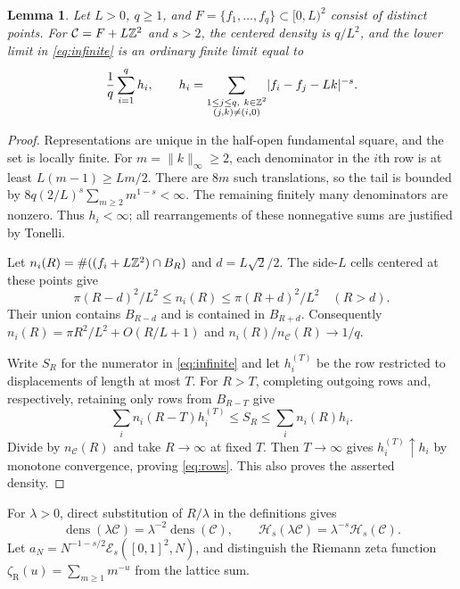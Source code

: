 \documentclass[11pt]{article}
\newtheorem{lemma}[theorem]{Lemma}
\newcommand{\Es}{\mathcal E_s}\newcommand{\Hs}{\mathcal H_s}
\newcommand{\abs}[1]{\lvert#1\rvert}\newcommand{\norm}[1]{\lVert#1\rVert}
\begin{document}
\begin{lemma}\label{lem:periodic}
Let $L>0$, $q\ge1$, and $F=\{f_1,\ldots,f_q\}\subset[0,L)^2$ consist of distinct
points. For $\mathcal C=F+L\mathbb Z^2$ and $s>2$, the centered density is $q/L^2$,
and the lower limit in \eqref{eq:infinite} is an ordinary finite limit equal to
\begin{equation}\label{eq:rows}
 \frac1q\sum_{i=1}^q h_i,\qquad
 h_i=\sum_{\substack{1\le j\le q,\ k\in\Z^2\\(j,k)\ne(i,0)}}
       \abs{f_i-f_j-Lk}^{-s}.
\end{equation}
\end{lemma}
\begin{proof}
Representations are unique in the half-open fundamental square, and the set
is locally finite. For $m=\norm{k}_\infty\ge2$, each denominator in the
$i$th row is at least $L(m-1)\ge Lm/2$. There are $8m$ such translations,
so the tail is bounded by $8q(2/L)^s\sum_{m\ge2}m^{1-s}<\infty$.
The remaining finitely many denominators are nonzero. Thus $h_i<\infty$;
all rearrangements of these nonnegative sums are justified by Tonelli.

Let $n_i(R)=\#((f_i+L\mathbb Z^2)\cap B_R)$ and $d=L\sqrt2/2$.
The side-$L$ cells centered at these points give
\[
 \pi(R-d)^2/L^2\le n_i(R)\le\pi(R+d)^2/L^2\quad(R>d).
\]
Their union contains $B_{R-d}$ and is contained in $B_{R+d}$.
Consequently $n_i(R)=\pi R^2/L^2+O(R/L+1)$ and
$n_i(R)/n_{\mathcal C}(R)\to1/q$.

Write $S_R$ for the numerator in \eqref{eq:infinite} and let $h_i^{(T)}$
be the row restricted to displacements of length at most $T$.
For $R>T$, completing outgoing rows and, respectively, retaining only
rows from $B_{R-T}$ give
\[
 \sum_i n_i(R-T)h_i^{(T)}\le S_R\le\sum_i n_i(R)h_i.
\]
Divide by $n_{\mathcal C}(R)$ and take $R\to\infty$ at fixed $T$.
Then $T\to\infty$ gives $h_i^{(T)}\uparrow h_i$ by monotone convergence,
proving \eqref{eq:rows}. This also proves the asserted density.
\end{proof}

For $\lambda>0$, direct substitution of $R/\lambda$ in the definitions gives
\begin{equation}\label{eq:scaling}
 \operatorname{dens}(\lambda\mathcal C)=\lambda^{-2}\operatorname{dens}(\mathcal C),
 \qquad \Hs(\lambda\mathcal C)=\lambda^{-s}\Hs(\mathcal C).
\end{equation}
Let $a_N=N^{-1-s/2}\Es([0,1]^2,N)$, and distinguish the Riemann zeta
function $\zeta_{\mathrm R}(u)=\sum_{m\ge1}m^{-u}$ from the lattice sum.
\end{document}
